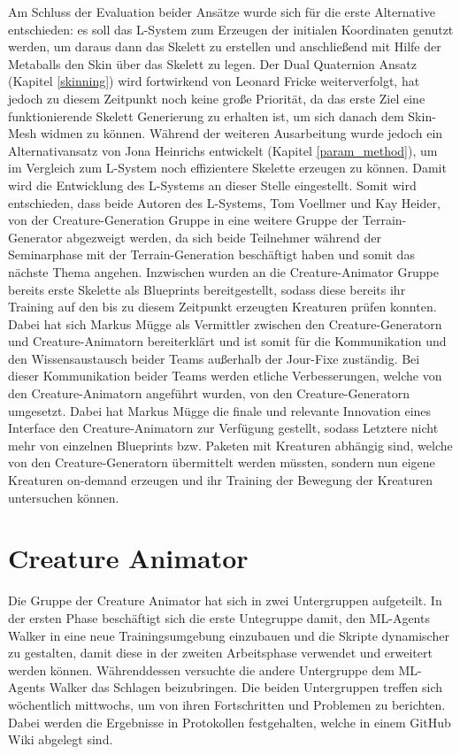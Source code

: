 Am Schluss der Evaluation beider Ansätze wurde sich für die erste Alternative entschieden: es soll das L-System zum Erzeugen der initialen Koordinaten genutzt werden, um daraus dann das Skelett zu erstellen und anschließend mit Hilfe der Metaballs den Skin über das Skelett zu legen. Der Dual Quaternion Ansatz (Kapitel \ref{skinning}) wird fortwirkend von Leonard Fricke weiterverfolgt, hat jedoch zu diesem Zeitpunkt noch keine große Priorität, da das erste Ziel eine funktionierende Skelett Generierung zu erhalten ist, um sich danach dem Skin-Mesh widmen zu können. Während der weiteren Ausarbeitung wurde jedoch ein Alternativansatz von Jona Heinrichs entwickelt (Kapitel \ref{param_method}), um im Vergleich zum L-System noch effizientere Skelette erzeugen zu können. Damit wird die Entwicklung des L-Systems an dieser Stelle eingestellt. Somit wird entschieden, dass beide Autoren des L-Systems, Tom Voellmer und Kay Heider, von der Creature-Generation Gruppe in eine weitere Gruppe der Terrain-Generator abgezweigt werden, da sich beide Teilnehmer während der Seminarphase mit der Terrain-Generation beschäftigt haben und somit das nächste Thema angehen. Inzwischen wurden an die Creature-Animator Gruppe bereits erste Skelette als Blueprints bereitgestellt, sodass diese bereits ihr Training auf den bis zu diesem Zeitpunkt erzeugten Kreaturen prüfen konnten. Dabei hat sich Markus Mügge als Vermittler zwischen den Creature-Generatorn und Creature-Animatorn bereiterklärt und ist somit für die Kommunikation und den Wissensaustausch beider Teams außerhalb der Jour-Fixe zuständig. Bei dieser Kommunikation beider Teams werden etliche Verbesserungen, welche von den Creature-Animatorn angeführt wurden, von den Creature-Generatorn umgesetzt. Dabei hat Markus Mügge die finale und relevante Innovation eines Interface den Creature-Animatorn zur Verfügung gestellt, sodass Letztere nicht mehr von einzelnen Blueprints bzw. Paketen mit Kreaturen abhängig sind, welche von den Creature-Generatorn übermittelt werden müssten, sondern nun eigene Kreaturen on-demand erzeugen und ihr Training der Bewegung der Kreaturen untersuchen können.



\section{Creature Animator}\label{sec:creature-animation-orga}
Die Gruppe der Creature Animator hat sich in zwei Untergruppen aufgeteilt. In der ersten Phase beschäftigt sich die erste Untegruppe damit, den ML-Agents Walker in eine neue Trainingsumgebung einzubauen und die Skripte dynamischer zu gestalten, damit diese in der zweiten Arbeitsphase verwendet und erweitert werden können. Währenddessen versuchte die andere Untergruppe dem ML-Agents Walker das Schlagen beizubringen. Die beiden Untergruppen treffen sich wöchentlich mittwochs, um von ihren Fortschritten und Problemen zu berichten. Dabei werden die Ergebnisse in Protokollen festgehalten, welche in einem GitHub Wiki abgelegt sind.

